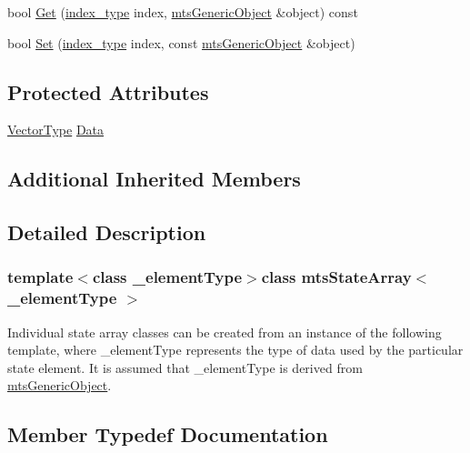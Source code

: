 {\bf }\par
\begin{DoxyCompactItemize}
\item 
bool \hyperlink{classmts_state_array_a8995237a36530f1d5e8704f8f30622e4}{Get} (\hyperlink{classmts_state_array_base_a22ecbf65a907a7550951d12970f3df1d}{index\+\_\+type} index, \hyperlink{classmts_generic_object}{mts\+Generic\+Object} \&object) const 
\item 
bool \hyperlink{classmts_state_array_a0375f515039b5904a33c535318bc9101}{Set} (\hyperlink{classmts_state_array_base_a22ecbf65a907a7550951d12970f3df1d}{index\+\_\+type} index, const \hyperlink{classmts_generic_object}{mts\+Generic\+Object} \&object)
\end{DoxyCompactItemize}

\subsection*{Protected Attributes}
\begin{DoxyCompactItemize}
\item 
\hyperlink{classmts_state_array_a4d8a41652bc6d14fb99d28c71286058a}{Vector\+Type} \hyperlink{classmts_state_array_a4ae00b885b6acad1662b1f77451ba791}{Data}
\end{DoxyCompactItemize}
\subsection*{Additional Inherited Members}


\subsection{Detailed Description}
\subsubsection*{template$<$class \+\_\+element\+Type$>$class mts\+State\+Array$<$ \+\_\+element\+Type $>$}

Individual state array classes can be created from an instance of the following template, where \+\_\+element\+Type represents the type of data used by the particular state element. It is assumed that \+\_\+element\+Type is derived from \hyperlink{classmts_generic_object}{mts\+Generic\+Object}. 

\subsection{Member Typedef Documentation}
\hypertarget{classmts_state_array_a40a7371d5f45f10e9cd9308cccef0168}{}
